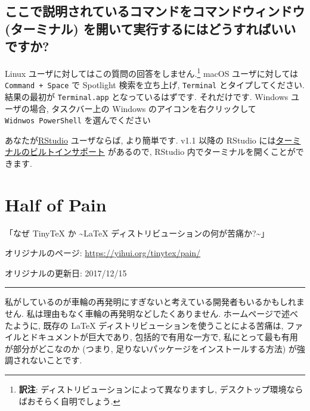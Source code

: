 \documentclass[
  xelatex,ja=standard,jafont=noto]{bxjsreport}
\begin{document}
\hypertarget{ux3053ux3053ux3067ux8aacux660eux3055ux308cux3066ux3044ux308bux30b3ux30deux30f3ux30c9ux3092ux30b3ux30deux30f3ux30c9ux30a6ux30a3ux30f3ux30c9ux30a6-ux30bfux30fcux30dfux30caux30eb-ux3092ux958bux3044ux3066ux5b9fux884cux3059ux308bux306bux306fux3069ux3046ux3059ux308cux3070ux3044ux3044ux3067ux3059ux304b}{%
\section{ここで説明されているコマンドをコマンドウィンドウ (ターミナル)
を開いて実行するにはどうすればいいですか?}\label{ux3053ux3053ux3067ux8aacux660eux3055ux308cux3066ux3044ux308bux30b3ux30deux30f3ux30c9ux3092ux30b3ux30deux30f3ux30c9ux30a6ux30a3ux30f3ux30c9ux30a6-ux30bfux30fcux30dfux30caux30eb-ux3092ux958bux3044ux3066ux5b9fux884cux3059ux308bux306bux306fux3069ux3046ux3059ux308cux3070ux3044ux3044ux3067ux3059ux304b}}

Linux ユーザに対してはこの質問の回答をしません.\footnote{\textbf{訳注}:
  ディストリビューションによって異なりますし,
  デスクトップ環境ならばおそらく自明でしょう.} macOS ユーザに対しては
\texttt{Command\ +\ Space} で Spotlight 検索を立ち上げ,
\texttt{Terminal} とタイプしてください. 結果の最初が
\texttt{Terminal.app} となっているはずです. それだけです. Windows
ユーザの場合, タスクバー上の Windows のアイコンを右クリックして
\texttt{Widnwos\ PowerShell} を選んでください

あなたが\href{https://www.rstudio.com}{RStudio} ユーザならば,
より簡単です. v1.1 以降の RStudio
には\href{https://blog.rstudio.com/2017/08/11/rstudio-v1-1-preview-terminal/}{ターミナルのビルトインサポート}
があるので, RStudio 内でターミナルを開くことができます.

\hypertarget{pain}{%
\chapter{Half of Pain}\label{pain}}

「なぜ TinyTeX か \textasciitilde LaTeX
ディストリビューションの何が苦痛か?\textasciitilde」

オリジナルのページ: \url{https://yihui.org/tinytex/pain/}

オリジナルの更新日: 2017/12/15

\begin{center}\rule{0.5\linewidth}{0.5pt}\end{center}

私がしているのが車輪の再発明にすぎないと考えている開発者もいるかもしれません.
私は理由もなく車輪の再発明などしたくありません.
ホームページで述べたように, 既存の LaTeX
ディストリビューションを使うことによる苦痛は,
ファイルとドキュメントが巨大であり, 包括的で有用な一方で,
私にとって最も有用が部分がどこなのか (つまり,
足りないパッケージをインストールする方法) が強調されないことです.
\end{document}

